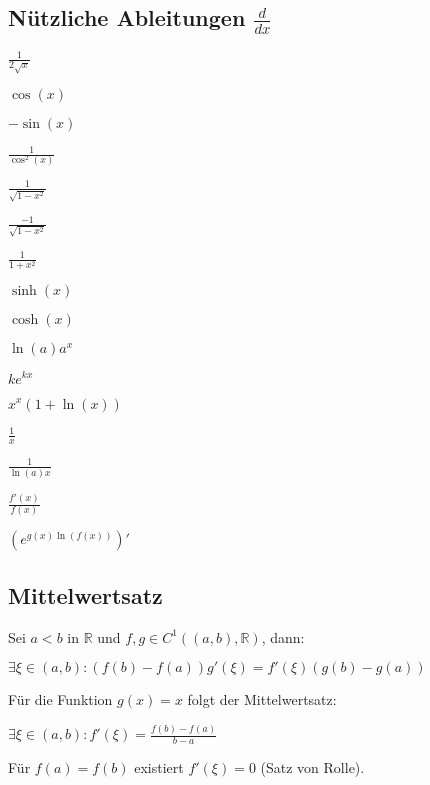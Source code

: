 \subsection*{Nützliche Ableitungen $\frac{d}{dx}$}

\vspace*{-4mm}
\begin{multicols}{2}
\begin{description}[leftmargin=!,labelwidth=14mm]
	\item[$\sqrt{x}$]    $\frac{1}{2\sqrt{x}}$
	\item[$\sin(x)$]     $\cos(x)$
	\item[$\cos(x)$]     $-\sin(x)$
	\item[$\tan(x)$]     $\frac{1}{\cos^2(x)}$
	\item[$\arcsin(x)$]  $\frac{1}{\sqrt{1-x^2}}$
	\item[$\arccos(x)$]  $\frac{-1}{\sqrt{1-x^2}}$
	\item[$\arctan(x)$]  $\frac{1}{1+x^2}$
	\item[$\cosh(x)$]    $\sinh(x)$
	\item[$\sinh(x)$]    $\cosh(x)$
	\item[$a^x$]         $\ln(a) a^x$
	\item[$e^{kx}$]      $ke^{kx}$
	\item[$x^x$]         $x^x(1+\ln(x))$
	\item[$\ln(x)$]      $\frac{1}{x}$
	\item[$\log_a(x)$]   $\frac{1}{\ln(a) x}$
	\item[$\ln(f(x))$]   $\frac{f'(x)}{f(x)}$
	\item[$f(x)^{g(x)}$] $(e^{g(x)\ln(f(x))})'$
\end{description}
\end{multicols}
\vspace*{-4mm}

\subsection*{Mittelwertsatz}

Sei $a < b$ in $\mathbb{R}$ und $f, g \in C^1((a, b),\mathbb{R})$, dann:

$\exists \xi \in (a, b) : ( f(b) - f(a) ) g'(\xi) = f'(\xi)(g(b) - g(a))$

Für die Funktion $g(x)=x$ folgt der Mittelwertsatz:

$\exists \xi \in (a, b) : f'(\xi) = \frac{f(b) - f(a)}{b - a}$

Für $f(a)=f(b)$ existiert $f'(\xi)=0$ (Satz von Rolle).

